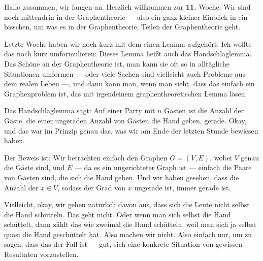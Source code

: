 \begin{spoken-clean}[00:00:00 - 00:01:58]
Hallo zusammen, wir fangen an. Herzlich willkommen zur \textbf{11.} Woche. Wir sind noch mittendrin in der Graphentheorie --- also ein ganz kleiner Einblick in ein bisschen, um was es in der Graphentheorie, Teilen der Graphentheorie geht.

Letzte Woche haben wir noch kurz mit dem einen Lemma aufgehört. Ich wollte das noch kurz umformulieren: Dieses Lemma heißt auch das Handschlaglemma.  Das Schöne an der Graphentheorie ist, man kann sie oft so in alltägliche Situationen umformen --- oder viele Sachen sind vielleicht auch Probleme aus dem realen Leben ---, und dann kann man, wenn man sieht, dass das einfach ein Graphenproblem ist, das mit irgendeinem graphentheoretischen Lemma lösen.

Das Handschlaglemma sagt: Auf einer Party mit $n$ Gästen ist die Anzahl der Gäste, die einer ungeraden Anzahl von Gästen die Hand geben, gerade. Okay, und das war im Prinzip genau das, was wir am Ende der letzten Stunde bewiesen haben.

Der Beweis ist:  Wir betrachten einfach den Graphen $G = (V, E)$, wobei $V$ genau die Gäste sind, und $E$ --- da es ein ungerichteter Graph ist --- einfach die Paare von Gästen sind, die sich die Hand geben. Und wir haben gesehen, dass die Anzahl der $x \in V$, sodass der Grad von $x$ ungerade ist, immer gerade ist.

Vielleicht, okay, wir gehen natürlich davon aus, dass sich die Leute nicht selbst die Hand schütteln. Das geht nicht. Oder wenn man sich selbst die Hand schüttelt, dann zählt das wie zweimal die Hand schütteln, weil man sich ja selbst quasi die Hand geschüttelt hat. Also machen wir nicht. Also einfach nur, um zu sagen, dass das der Fall ist --- gut, sich eine konkrete Situation von gewissen Resultaten vorzustellen.
\end{spoken-clean}

